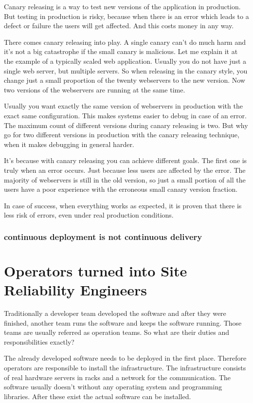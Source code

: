 Canary releasing is a way to test new versions of the application in production. But testing in production is risky, because when there is an error which leads to a defect or failure the users will get affected. And this costs money in any way.

There comes canary releasing into play. A single canary can't do much harm and it's not a big catastrophe if the small canary is malicious. Let me explain it at the example of a typically scaled web application. Usually you do not have just a single web server, but multiple servers. So when releasing in the canary style, you change just a small proportion of the twenty webservers to the new version. Now two versions of the webservers are running at the same time.

Usually you want exactly the same version of webservers in production with the exact same configuration. This makes systems easier to debug in case of an error. The maximum count of different versions during canary releasing is two. But why go for two different versions in production with the canary releasing technique, when it makes debugging in general harder.

It's because with canary releasing you can achieve different goals. The first one is truly when an error occurs. Just because less users are affected by the error. The majority of webservers is still in the old version, so just a small portion of all the users have a poor experience with the erroneous small canary version fraction.

In case of success, when everything works as expected, it is proven that there is less risk of errors, even under real production conditions.


\subsection{continuous deployment is not continuous delivery}

\chapter{Operators turned into Site Reliability Engineers}

Traditionally a developer team developed the software and after they were finished, another team runs the software and keeps the software running. Those teams are usually referred as operation teams. So what are their duties and responsibilities exactly?

The already developed software needs to be deployed in the first place. Therefore operators are responsible to install the infrastructure. The infrastructure consists of real hardware servers in racks and a network for the communication. The software usually doesn't without any operating system and programming libraries. After these exist the actual software can be installed.

